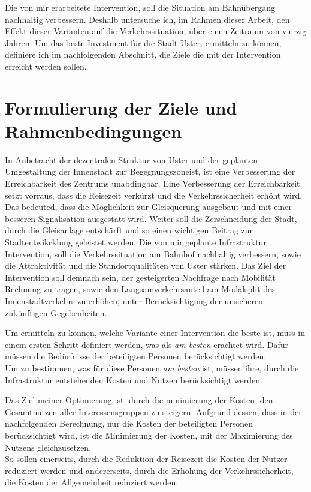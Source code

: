 Die von mir erarbeitete Intervention, soll die Situation am Bahnübergang nachhaltig verbessern. Deshalb untersuche ich, im Rahmen dieser Arbeit, den Effekt dieser Varianten auf die Verkehrssituation, über einen Zeitraum von vierzig Jahren. Um das beste Investment für die Stadt Uster, ermitteln zu können, definiere ich im nachfolgenden Abschnitt, die Ziele die mit der Intervention erreicht werden sollen.

\pagebreak

\section{Formulierung der Ziele und Rahmenbedingungen}
\label{sec:Zielformulierung}

In Anbetracht der dezentralen Struktur von Uster und der geplanten Umgestaltung der Innenstadt zur Begegnungszoneist, ist eine Verbesserung der Erreichbarkeit des Zentrums unabdingbar. Eine Verbesserung der Erreichbarkeit setzt vorraus, dass die Reisezeit verkürzt und die Verkehrssicherheit erhöht wird. Das bedeuted, dass die Möglichkeit zur Gleisquerung ausgebaut und mit einer besseren Signalisation ausgestatt wird. Weiter soll die Zerschneidung der Stadt, durch die Gleisanlage entschärft und so einen wichtigen Beitrag zur Stadtentwikcklung geleistet werden. Die von mir geplante Infrastruktur Intervention, soll die Verkehrssituation am Bahnhof nachhaltig verbessern, sowie die Attraktivität und die Standortqualitäten von Uster stärken.
Das Ziel der Intervention soll demnach sein, der gesteigerten Nachfrage nach Mobilität Rechnung zu tragen, sowie den Langsamverkehrsanteil am Modalsplit des Innenstadtverkehrs zu erhöhen, unter Berücksichtigung der unsicheren zukünftigen Gegebenheiten.

Um ermitteln zu können, welche Variante einer Intervention die beste ist, muss in einem ersten Schritt definiert werden, was als \textit{am besten} erachtet wird. Dafür müssen die Bedürfnisse der beteiligten Personen berücksichtigt werden. \\
Um zu bestimmen, was für diese Personen \textit{am besten} ist, müssen ihre, durch die Infrastruktur entstehenden Kosten und Nutzen berücksichtigt werden.
 
Das Ziel meiner Optimierung ist, durch die minimierung der Kosten, den Gesamtnutzen aller Interessensgruppen zu steigern. Aufgrund dessen, dass in der nachfolgenden Berechnung, nur die Kosten der beteiligten Personen berücksichtigt wird, ist die Minimierung der Kosten, mit der Maximierung des Nutzens gleichzusetzen. \\
So sollen einerseits, durch die Reduktion der Reisezeit die Kosten der Nutzer reduziert werden und andererseits, durch die Erhöhung der Verkehrssicherheit, die Kosten der Allgemeinheit reduziert werden. 



